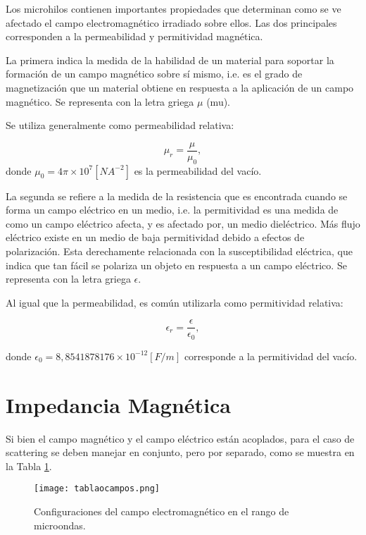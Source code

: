 \documentclass[12pt,letterpaper]{report}
\numberwithin{equation}{section}
\begin{document}
Los microhilos contienen importantes propiedades que determinan como se ve afectado el campo electromagnético irradiado sobre ellos. Las dos principales corresponden a la permeabilidad y permitividad magnética. 

La primera indica la medida de la habilidad de un material para soportar la formación de un campo magnético sobre sí mismo, i.e. es el grado de magnetización que un material obtiene en respuesta a la aplicación de un campo magnético. Se representa con la letra griega $\mu$ (mu). 

Se utiliza generalmente como permeabilidad relativa:

\begin{equation}
\mu_{r}  = \frac{\mu}{\mu_{0}},
\end{equation}
donde $\mu_{0} = 4 \pi \times 10^7 [N A^{-2}]$ es la permeabilidad del vacío. 

La segunda se refiere a la medida de la resistencia que es encontrada cuando se forma un campo eléctrico en un medio, i.e. la permitividad es una medida de como un campo eléctrico afecta, y es afectado por, un medio dieléctrico. Más flujo eléctrico existe en un medio de baja permitividad debido a efectos de polarización. Esta derechamente relacionada con la susceptibilidad eléctrica, que indica que tan fácil se polariza un objeto en respuesta a un campo eléctrico. Se representa con la letra griega $\epsilon$.

Al igual que la permeabilidad, es común utilizarla como permitividad relativa:

\begin{equation}
\epsilon_{r}  = \frac{\epsilon}{\epsilon_{0}},
\end{equation}

\noindent donde $\epsilon_{0} = 8,8541878176 \times 10^{-12} [F/m]$ corresponde a la permitividad del vacío.

\section{Impedancia Magnética}

Si bien el campo magnético y el campo eléctrico están acoplados, para el caso de scattering se deben manejar en conjunto, pero por separado, como se muestra en la Tabla \ref{fig: tablacampos}.

\begin{figure}[H]
	\centering\texttt{[image: tablaocampos.png]}
	\caption{Configuraciones del campo electromagnético en el rango de microondas. \cite{Wire_theory_2}}
	\label{fig: tablacampos}
\end{figure} 
\end{document}
